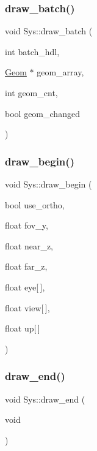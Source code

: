 \mbox{\label{classSys_aa6238558baf8cc9cd33b6e64e4692bc1}} 
\subsubsection{\texorpdfstring{draw\+\_\+batch()}{draw\_batch()}}
{\footnotesize\ttfamily void Sys\+::draw\+\_\+batch (\begin{DoxyParamCaption}\item[{int}]{batch\+\_\+hdl,  }\item[{\mbox{\hyperlink{classGeom}{Geom}} $\ast$}]{geom\+\_\+array,  }\item[{int}]{geom\+\_\+cnt,  }\item[{bool}]{geom\+\_\+changed }\end{DoxyParamCaption})}

\mbox{\label{classSys_aa9df1a08f130a88706e3f06faae56bb6}} 
\subsubsection{\texorpdfstring{draw\+\_\+begin()}{draw\_begin()}}
{\footnotesize\ttfamily void Sys\+::draw\+\_\+begin (\begin{DoxyParamCaption}\item[{bool}]{use\+\_\+ortho,  }\item[{float}]{fov\+\_\+y,  }\item[{float}]{near\+\_\+z,  }\item[{float}]{far\+\_\+z,  }\item[{float}]{eye\mbox{[}$\,$\mbox{]},  }\item[{float}]{view\mbox{[}$\,$\mbox{]},  }\item[{float}]{up\mbox{[}$\,$\mbox{]} }\end{DoxyParamCaption})}

\mbox{\label{classSys_a9f9738ef3a861766c5450569de9f1671}} 
\subsubsection{\texorpdfstring{draw\+\_\+end()}{draw\_end()}}
{\footnotesize\ttfamily void Sys\+::draw\+\_\+end (\begin{DoxyParamCaption}\item[{void}]{ }\end{DoxyParamCaption})}

